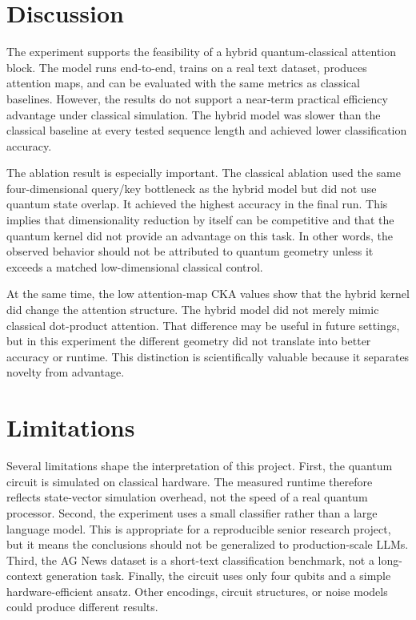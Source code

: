 \documentclass[11pt]{article}
\begin{document}
\section{Discussion}
The experiment supports the feasibility of a hybrid quantum-classical attention block. The model runs end-to-end, trains on a real text dataset, produces attention maps, and can be evaluated with the same metrics as classical baselines. However, the results do not support a near-term practical efficiency advantage under classical simulation. The hybrid model was slower than the classical baseline at every tested sequence length and achieved lower classification accuracy.

The ablation result is especially important. The classical ablation used the same four-dimensional query/key bottleneck as the hybrid model but did not use quantum state overlap. It achieved the highest accuracy in the final run. This implies that dimensionality reduction by itself can be competitive and that the quantum kernel did not provide an advantage on this task. In other words, the observed behavior should not be attributed to quantum geometry unless it exceeds a matched low-dimensional classical control.

At the same time, the low attention-map CKA values show that the hybrid kernel did change the attention structure. The hybrid model did not merely mimic classical dot-product attention. That difference may be useful in future settings, but in this experiment the different geometry did not translate into better accuracy or runtime. This distinction is scientifically valuable because it separates novelty from advantage.

\section{Limitations}
Several limitations shape the interpretation of this project. First, the quantum circuit is simulated on classical hardware. The measured runtime therefore reflects state-vector simulation overhead, not the speed of a real quantum processor. Second, the experiment uses a small classifier rather than a large language model. This is appropriate for a reproducible senior research project, but it means the conclusions should not be generalized to production-scale LLMs. Third, the AG News dataset is a short-text classification benchmark, not a long-context generation task. Finally, the circuit uses only four qubits and a simple hardware-efficient ansatz. Other encodings, circuit structures, or noise models could produce different results.
\end{document}
